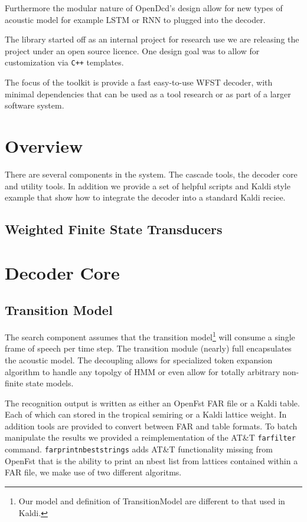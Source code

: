 \documentclass{article}
\begin{document}
Furthermore the modular nature of OpenDcd's  design allow for new types of 
acoustic model for example LSTM or RNN to plugged into the decoder. 

The library started off as an internal project for research use we are
releasing the project under an open source licence. One design goal was 
to allow for customization via \texttt{C++} templates.

The focus of the toolkit is provide a fast easy-to-use WFST decoder,
with minimal dependencies that can be used as a tool research or
as part of a larger software system.

\section{Overview}
\label{sec:format}
There are several components in the system. The cascade tools, the decoder core
and utility tools. In addition we provide a set of helpful scripts and Kaldi style
example that show how to integrate the decoder into a standard Kaldi reciee.


\subsection{Weighted Finite State Transducers}


\section{Decoder Core}
\label{sec:decodercore}

\subsection{Transition Model}
The search component assumes that the transition model\footnote{Our model and definition of TransitionModel
are different to that used in Kaldi.} will consume a single
frame of speech per time step. The transition module (nearly) full encapsulates
the acoustic model. The decoupling allows for specialized token expansion algorithm
to handle any topolgy of HMM or even allow for totally arbitrary non-finite state
models. 


The recognition output is written as either an OpenFst FAR file or a Kaldi table. Each of which can
stored in the tropical semiring or a Kaldi lattice weight. In addition tools are provided to convert
between FAR and table formats. To batch manipulate the results we provided a reimplementation of
the AT\&T \texttt{farfilter} command. \texttt{farprintnbeststrings} adds AT\&T functionality missing
from OpenFst that is the ability to print an nbest list from lattices contained within a FAR file,
we make use of two different algoritms. 
\end{document}
